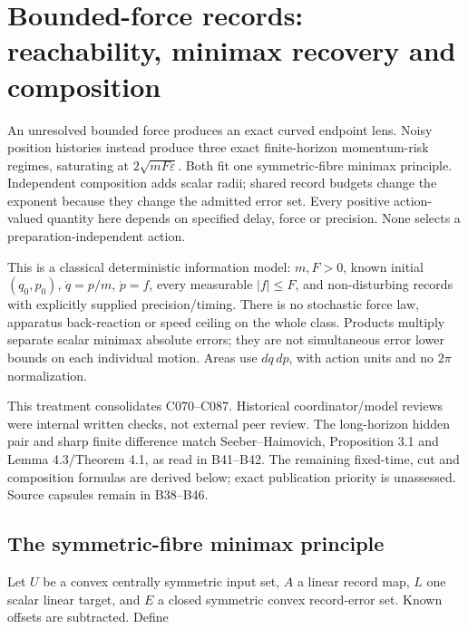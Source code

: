 \documentclass[11pt,a4paper]{article}
\begin{document}
\hypertarget{bounded-force-records-reachability-minimax-recovery-and-composition}{%
\section{Bounded-force records: reachability, minimax recovery and
composition}\label{bounded-force-records-reachability-minimax-recovery-and-composition}}

An unresolved bounded force produces an exact curved endpoint lens.
Noisy position histories instead produce three exact finite-horizon
momentum-risk regimes, saturating at \(2\sqrt{mF\varepsilon}\). Both fit
one symmetric-fibre minimax principle. Independent composition adds
scalar radii; shared record budgets change the exponent because they
change the admitted error set. Every positive action-valued quantity
here depends on specified delay, force or precision. None selects a
preparation-independent action.

This is a classical deterministic information model: \(m,F>0\), known
initial \((q_0,p_0)\), \(\dot q=p/m\), \(\dot p=f\), every measurable
\(|f|\le F\), and non-disturbing records with explicitly supplied
precision/timing. There is no stochastic force law, apparatus
back-reaction or speed ceiling on the whole class. Products multiply
separate scalar minimax absolute errors; they are not simultaneous error
lower bounds on each individual motion. Areas use \(dq\,dp\), with
action units and no \(2\pi\) normalization.

This treatment consolidates C070--C087. Historical coordinator/model
reviews were internal written checks, not external peer review. The
long-horizon hidden pair and sharp finite difference match
Seeber--Haimovich, Proposition 3.1 and Lemma 4.3/Theorem 4.1, as read in
B41--B42. The remaining fixed-time, cut and composition formulas are
derived below; exact publication priority is unassessed. Source capsules
remain in B38--B46.

\hypertarget{the-symmetric-fibre-minimax-principle}{%
\subsection{The symmetric-fibre minimax
principle}\label{the-symmetric-fibre-minimax-principle}}

Let \(U\) be a convex centrally symmetric input set, \(A\) a linear
record map, \(L\) one scalar linear target, and \(E\) a closed symmetric
convex record-error set. Known offsets are subtracted. Define
\end{document}
